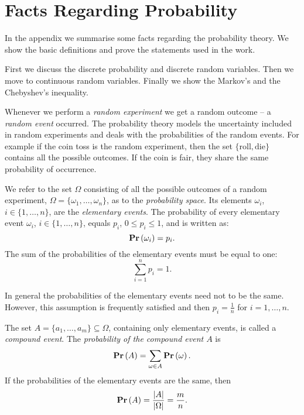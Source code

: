 \chapter{Facts Regarding Probability}
In the appendix we summarise some facts regarding the probability theory. We show the basic definitions and prove the statements used in the work.

First we discuss the discrete probability and discrete random variables. Then we move to continuous random variables. Finally we show the Markov's and the Chebyshev's inequality.

Whenever we perform a \emph{random experiment} we get a random outcome -- a \emph{random event} occurred. The probability theory models the uncertainty included in random experiments and deals with the probabilities of the random events. For example if the coin toss is the random experiment, then the set $\{\text{roll}, \text{die}\}$ contains all the possible outcomes. If the coin is fair, they share the same probability of occurrence.

\begin{definition}
We refer to the set $\Omega$ consisting of all the possible outcomes of a random experiment, $\Omega = \{ \omega_1, \dots, \omega_n \}$, as to the \emph{probability space}. Its elements $\omega_i$, $i \in \{1, \dots, n\}$, are the \emph{elementary events}. The probability of every elementary event $\omega_i$, $i \in \{1, \dots, n\}$, equals $p_i$, $0 \leq p_i \leq 1$, and is written as: \[ \mathbf{Pr}\left(\omega_i\right) = p_i \text{.} \] The sum of the probabilities of the elementary events must be equal to one:
\[
\displaystyle\sum_{i = 1}^{n} p_i = 1 \text{.}
\]
\end{definition}

In general the probabilities of the elementary events need not to be the same. However, this assumption is frequently satisfied and then $p_i = \frac{1}{n}$ for $i = 1, \dots, n$.

\begin{definition}
The set $A = \{a_1, \dots, a_m \}\subseteq \Omega$, containing only elementary events, is called a \emph{compound event}. The \emph{probability of the compound event $A$} is \[ \mathbf{Pr}\left(A\right) = \displaystyle\sum_{\omega \in A} \mathbf{Pr}\left(\omega\right) \text{.} \] If the probabilities of the elementary events are the same, then 
\[
	\mathbf{Pr}\left(A\right) = \frac{|A|}{|\Omega|} = \frac{m}{n} \text{.}
\]
\end{definition}

